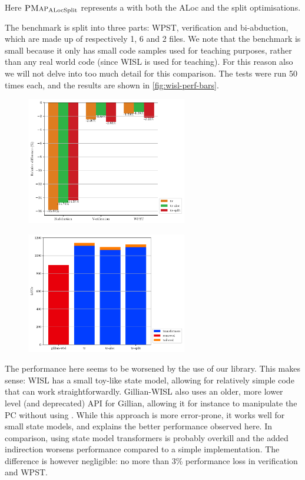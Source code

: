 Here $\textsc{PMap}_{\text{ALocSplit}}$ represents a \PMap{} with both the ALoc and the split optimisations.

The benchmark is split into three parts: WPST, verification and bi-abduction, which are made up of respectively 1, 6 and 2 files. We note that the benchmark is small because it only has small code samples used for teaching purposes, rather than any real world code (since WISL is used for teaching). For this reason also we will not delve into too much detail for this comparison. The tests were run 50 times each, and the results are shown in \autoref{fig:wisl-perf-bars}.

\begin{figure}
\centering
\begin{minipage}[t]{.45\textwidth}
	\centering
	\includegraphics[width=7cm]{figures/wisl/avg_mode_relative_diff.pdf}
	\label{fig:wisl-perf-bars}
\end{minipage}\hfill%
\begin{minipage}[t]{.45\textwidth}
	\centering
	\includegraphics[width=7cm]{figures/wisl/locs.pdf}
	\label{fig:wisl-locs}
\end{minipage}%
\end{figure}

The performance here seems to be worsened by the use of our library. This makes sense: WISL has a small toy-like state model, allowing for relatively simple code that can work straightforwardly. Gillian-WISL also uses an older, more lower level (and deprecated) API for Gillian, allowing it for instance to manipulate the PC without using . While this approach is more error-prone, it works well for small state models, and explains the better performance observed here. In comparison, using state model transformers is probably overkill and the added indirection worsens performance compared to a simple implementation. The difference is however negligible: no more than 3\% performance loss in verification and WPST.

